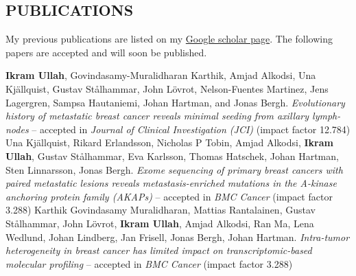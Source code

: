 \documentclass[margin, 10pt]{res} %
\begin{document}
\begin{resume}
\section{PUBLICATIONS} 
My previous publications are listed on my \href{https://scholar.google.com/citations?user=HjM0XDoAAAAJ&hl=en}{Google scholar page}. The following papers are accepted and will soon be published.
\begingroup
\renewcommand{\section}[2]{}%
\begin{thebibliography}{}
    \textbf{Ikram Ullah}, Govindasamy-Muralidharan Karthik, Amjad Alkodsi, Una Kj\"allquist, Gustav St\aa lhammar, John L\"ovrot, Nelson-Fuentes Martinez, Jens Lagergren, Sampsa Hautaniemi, Johan Hartman, and Jonas Bergh. \textit{Evolutionary history of metastatic breast cancer reveals minimal seeding from axillary lymph-nodes} -- accepted in {\sl Journal of Clinical Investigation (JCI)} (impact factor 12.784)
    Una Kj\"allquist, Rikard Erlandsson, Nicholas P Tobin, Amjad Alkodsi, \textbf{Ikram Ullah}, Gustav St\aa lhammar, Eva Karlsson, Thomas Hatschek, Johan Hartman, Sten Linnarsson, Jonas Bergh. \textit{Exome sequencing of primary breast cancers with paired metastatic lesions reveals metastasis-enriched mutations in the A-kinase anchoring protein family (AKAPs)} -- accepted in {\sl BMC Cancer} (impact factor 3.288)
    Karthik Govindasamy Muralidharan, Mattias Rantalainen, Gustav St\aa lhammar, John L\"ovrot, \textbf{Ikram Ullah}, Amjad Alkodsi, Ran Ma, Lena Wedlund, Johan Lindberg, Jan Frisell, Jonas Bergh, Johan Hartman. \textit{Intra-tumor heterogeneity in breast cancer has limited impact on transcriptomic-based molecular profiling} -- accepted in {\sl BMC Cancer} (impact factor 3.288)
\end{thebibliography}
\endgroup




\end{resume}
\end{document}
